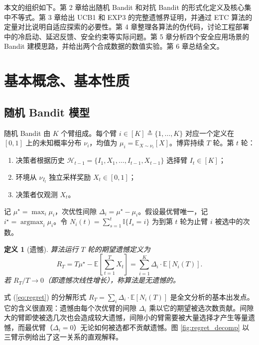 \documentclass[UTF8,a4paper,11pt,zihao=5]{ctexart}
\newtheorem{definition}[theorem]{定义}
\newcommand{\E}{\mathbb{E}}
\newcommand{\ind}{\mathbb{I}}
\newcommand{\argmax}{\mathop{\arg\max}}
\newcommand{\regret}[1]{R_{#1}}
\begin{document}
本文的组织如下。第 2 章给出随机 Bandit 和对抗 Bandit 的形式化定义及核心集中不等式。第 3 章给出 UCB1 和 EXP3 的完整遗憾界证明，并通过 ETC 算法的定量对比说明自适应探索的必要性。第 4 章整理各算法的伪代码，讨论工程部署中的冷启动、延迟反馈、安全约束等实际问题。第 5 章分析四个安全应用场景的 Bandit 建模思路，并给出两个合成数据的数值实验。第 6 章总结全文。

\newpage
\section{基本概念、基本性质}

\subsection{随机 Bandit 模型}

随机 Bandit 由 $K$ 个臂组成。每个臂 $i \in [K] \triangleq \{1, \dots, K\}$ 对应一个定义在 $[0, 1]$ 上的未知概率分布 $\nu_i$，均值为 $\mu_i = \E_{X \sim \nu_i}[X]$。博弈持续 $T$ 轮。第 $t$ 轮：

\begin{enumerate}[label=(\arabic*),leftmargin=2cm]
    \item 决策者根据历史 $\mathcal{H}_{t-1} = \{I_1, X_1, \dots, I_{t-1}, X_{t-1}\}$ 选择臂 $I_t \in [K]$；
    \item 环境从 $\nu_{I_t}$ 独立采样奖励 $X_t \in [0, 1]$；
    \item 决策者仅观测 $X_t$。
\end{enumerate}

记 $\mu^\star = \max_i \mu_i$，次优性间隙 $\Delta_i = \mu^\star - \mu_i$。假设最优臂唯一，记 $i^\star = \argmax_i \mu_i$。令 $N_i(t) = \sum_{s=1}^{t} \ind\{I_s = i\}$ 为到第 $t$ 轮为止臂 $i$ 被选中的次数。

\begin{definition}[遗憾]
算法运行 $T$ 轮的期望遗憾定义为
\begin{equation}\label{eq:regret}
    \regret{T} = T \mu^\star - \E\left[\sum_{t=1}^{T} X_t\right]
    = \sum_{i=1}^{K} \Delta_i \cdot \E[N_i(T)].
\end{equation}
若 $\regret{T} / T \to 0$（即遗憾次线性增长），称算法是\emph{无遗憾}的。
\end{definition}

式 (\ref{eq:regret}) 的分解形式 $\regret{T} = \sum_i \Delta_i \cdot \E[N_i(T)]$ 是全文分析的基本出发点。它的含义很直观：遗憾由每个次优臂的间隙 $\Delta_i$ 乘以它的期望被选次数贡献。间隙大的臂即使被选几次也会造成较大遗憾，间隙小的臂需要被大量选择才产生等量遗憾，而最优臂（$\Delta_i=0$）无论如何被选都不贡献遗憾。图 \ref{fig:regret_decomp} 以三臂示例给出了这一关系的直观解释。
\end{document}

